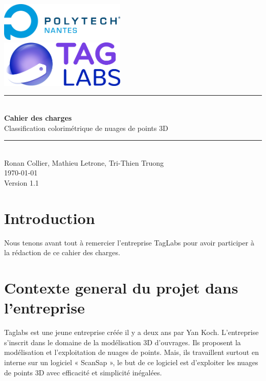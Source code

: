 \documentclass[12pt,titlepage,french]{article}
\begin{document}

\begin{titlepage}
\newcommand{\HRule}{\rule{\linewidth}{0.5mm}}
\center

  \includegraphics[width=0.45\textwidth]{./image2.png}\\[1cm]
   
  \includegraphics[width=0.45\textwidth]{./image1.png}


\HRule \\[0.4cm]
{ \huge \bfseries Cahier des charges \\[0.15cm] }
Classification colorimétrique de nuages de points 3D
\HRule \\[1.5cm]
Ronan Collier,
Mathieu Letrone,
Tri-Thien Truong
\\[1cm]
\today \\ [1cm]
Version 1.1
\end{titlepage}

\section{Introduction}

Nous tenons avant tout à remercier l'entreprise TagLabs pour avoir participer à la rédaction de ce cahier des charges.

\section{Contexte general du projet dans l'entreprise}

Taglabs est une jeune entreprise créée il y a deux ans par Yan Koch. L’entreprise s’inscrit dans le domaine de la modélisation 3D d’ouvrages. Ils proposent la modélisation et l’exploitation de nuages de points. Mais, ils travaillent surtout en interne sur un logiciel « ScanSap », le but de ce logiciel est d’exploiter les nuages de points 3D avec efficacité et simplicité inégalées.
\end{document}
